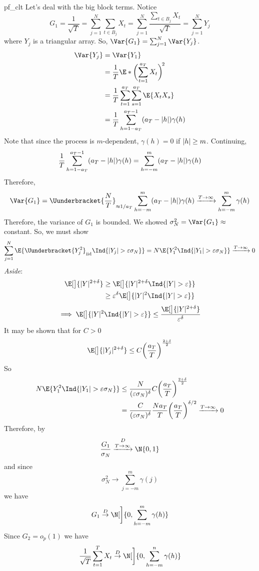 \begin{Proof}{}{pf_clt}
    Let's deal with the big block terms. Notice
    \[ G_1=\frac{1}{\sqrt{T}}=\sum_{j=1}^{N} \sum_{t\in B_j}X_t=
        \sum_{j=1}^{N}\frac{\sum_{t\in B_j} X_t}{\sqrt{T}}=\sum_{j=1}^{N}Y_j  \]
    where $ Y_{j} $ is a triangular array. So,
    $ \Var{G_1}=\sum_{j=1}^{N} \Var{Y_j} $.
    \begin{align*}
        \Var{Y_j}
         & =\Var{Y_1}                                                 \\
         & =\frac{1}{T} \E*{\biggl(\sum_{t=1}^{a_T}X_t\biggr)^{\!2}}  \\
         & =\frac{1}{T}\sum_{t=1}^{a_T} \sum_{s=1}^{a_T} \E{X_t X_s}  \\
         & =\frac{1}{T} \sum_{h=1-a_T}^{a_T-1} (a_T-\abs{h})\gamma(h)
    \end{align*}
    Note that since the process is $ m $-dependent, $ \gamma(h)=0 $ if $ \lvert h\rvert\ge m $.
    Continuing,
    \[ \frac{1}{T} \sum_{h=1-a_T}^{a_T-1} (a_T-\lvert h\rvert)\gamma(h)=
        \sum_{h=-m}^{m} (a_T-\lvert h\rvert)\gamma(h) \]
    Therefore,
    \[ \Var{G_1}=\Uunderbracket{\frac{N}{T}}_{\approx 1/a_T}
        \sum_{h=-m}^{m}(a_T-\abs{h})\gamma(h) \xrightarrow{T\to\infty} \sum_{h=-m}^{m} \gamma(h) \]
    Therefore, the variance of $ G_1 $ is bounded.
    We showed $ \sigma_N^2=\Var{G_1}\approx $ constant. So, we must show
    \[
        \sum_{j=1}^{N} \E{\Uunderbracket{Y_{j}^2}_{\text{iid}} \Ind{\abs{Y_{j}}>\varepsilon\sigma_N}}=
        N\E{Y_{1}^2 \Ind{\abs{Y_{1}}>\varepsilon\sigma_N}} \xrightarrow{T\to\infty}0
    \]
    \emph{Aside}:
    \begin{align*}
        \E[\big]{\abs{Y}^{2+\delta}}
         & \ge \E[\big]{\abs{Y}^{2+\delta}\Ind{\abs{Y}>\varepsilon}}           \\
         & \ge \varepsilon^\delta\E[\big]{\abs{Y}^2 \Ind{\abs{Y}>\varepsilon}} \\
    \end{align*}
    \[ \implies \E[\big]{\abs{Y}^2 \Ind{\abs{Y}>\varepsilon}}\le \frac{\E[\big]{\abs{Y}^{2+\delta}}}{\varepsilon^\delta} \]
    It may be shown that for $ C>0 $
    \[ \E[\big]{\abs{Y_j}^{2+\delta}}\le C\biggl(\frac{a_T}{T} \biggr)^{\frac{2+\delta}{2}} \]
    So
    \begin{align*}
        N\E{Y_{1}^2 \Ind{\abs{Y_{1}}>\varepsilon\sigma_N}}
         & \le \frac{N}{(\varepsilon\sigma_N)^\delta}C\biggl(\frac{a_T}{T} \biggr)^{\frac{2+\delta}{2}} \\
         & =\frac{C}{(\varepsilon\sigma_N)^\delta}
        \frac{N a_T}{T}\biggl(\frac{a_T}{T} \biggr)^{\delta/2}\xrightarrow{T\to\infty}0
    \end{align*}
    Therefore, by~
    \[ \frac{G_1}{\sigma_N}\stackrel{D}{\xrightarrow{T\to\infty}}\N{0,1}  \]
    and since
    \[ \sigma_N^2\to \sum_{j=-m}^{m} \gamma(j) \]
    we have
    \[ G_1\stackrel{D}{\to}\N[\bigg]{0,\sum_{h=-m}^{m} \gamma(h)} \]
    Since $ G_2=o_p(1) $ we have
    \[ \frac{1}{\sqrt{T}}\sum_{t=1}^{T} X_t\stackrel{D}{\to}\N[\bigg]{0,\sum_{h=-m}^{n} \gamma(h)}  \]
\end{Proof}

